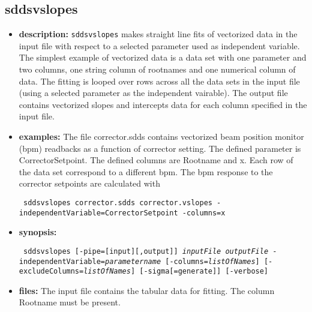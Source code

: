 %
%
%
%
\newpage

%
%
\subsection{sddsvslopes}
\label{sddsvslopes}

\begin{itemize}
\item {\bf description:}
%
%
\verb|sddsvslopes| makes straight line fits of vectorized data
in the input file with respect to a selected parameter used as independent variable.
The simplest example of vectorized data is a data set with one parameter and two columns,
one string column of rootnames and one numerical column of data.
The fitting is looped over rows across all the 
data sets in the input file (using a selected parameter as the
independent vairable). The output file contains
vectorized slopes and intercepts data for each column specified in the input file.

\item {\bf examples:} 
%
% 
%
The file corrector.sdds contains vectorized  beam position monitor (bpm)
readbacks as a function of corrector setting. The defined parameter is CorrectorSetpoint.
The defined columns are Rootname and x. Each row of the data set correspond to a different
bpm.
The bpm response to the corrector setpoints are calculated with
\begin{flushleft}{\tt
sddsvslopes corrector.sdds corrector.vslopes -independentVariable=CorrectorSetpoint 
  -columns=x
}\end{flushleft}
\item {\bf synopsis:} 
%
%
\begin{flushleft}{\tt
sddsvslopes [-pipe=[input][,output]] {\em inputFile} {\em outputFile} 
        -independentVariable={\em parametername}
        [-columns={\em listOfNames}] [-excludeColumns={\em listOfNames}] 
        [-sigma[=generate]] [-verbose]
}\end{flushleft}
\item {\bf files:}
The input file contains the tabular data for fitting. The column Rootname must be present.


\end{itemize}
